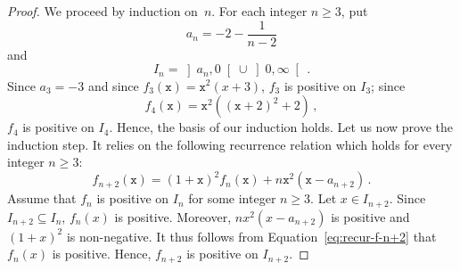 \documentclass[12pt]{article}
\newcommand{\ttx}{\mathtt{x}}
\newtheorem{theorem}{Theorem}
\begin{document}
 \begin{proof}
   We proceed by induction on~$n$.
   For each integer $n \ge 3$, put
   $$
   a_n = - 2 - \frac{1}{n - 2} 
   $$
   and
   $$
   I_n = \left] a_n, 0 \right[ \cup \left]0, \infty \right[ \, .
   $$
   Since $a_3 = - 3$ and since $f_3(\ttx) = \ttx^2 (x + 3)$,
   $f_3$ is positive on $I_3$;
   since
   $$
   f_4(\ttx) = \ttx^2 ({(\ttx + 2)}^2 + 2 ) \,, 
   $$
   $f_4$ is positive on $I_4$. 
   Hence, the basis of our induction holds.
   Let us now prove the induction step.
   It  relies on the following recurrence relation which holds for every integer $n \ge 3$:
   \begin{equation} \label{eq:recur-f-n+2} 
   f_{n + 2} (\ttx) = {(1 + \ttx)}^2 f_n(\ttx) + n \ttx^2 (\ttx - a_{n + 2}) \,.
   \end{equation}
   Assume that $f_n$ is positive on $I_n$ for some integer $n \ge 3$.
   Let $x \in I_{n + 2}$.
   Since $I_{n + 2} \subseteq I_n$,
   $f_n(x)$ is positive.
   Moreover, 
   $n x^2(x - a_{n + 2})$ is positive and ${(1 + x)}^2$ is non-negative.
   It thus follows from Equation~\eqref{eq:recur-f-n+2} that $f_n(x)$ is positive.
   Hence, $f_{n + 2}$ is positive on $I_{n + 2}$.
  \end{proof} 
 
    
  

\end{document}
